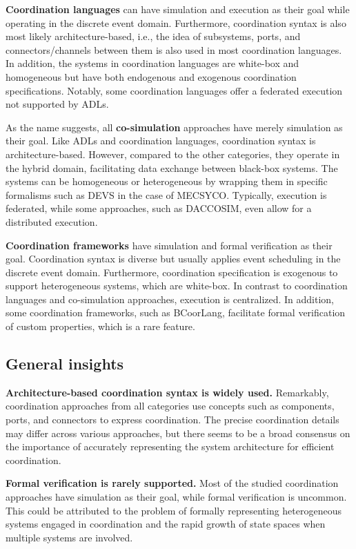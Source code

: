 \documentclass[runningheads]{llncs}
\begin{document}
\textbf{Coordination languages} can have simulation and execution as their goal while operating in the discrete event domain.
Furthermore, coordination syntax is also most likely architecture-based, i.e., the idea of subsystems, ports, and connectors/channels between them is also used in most coordination languages.
In addition, the systems in coordination languages are white-box and homogeneous but have both endogenous and exogenous coordination specifications.
Notably, some coordination languages offer a federated execution not supported by ADLs.

As the name suggests, all \textbf{co-simulation} approaches have merely simulation as their goal.
Like ADLs and coordination languages, coordination syntax is architecture-based.
However, compared to the other categories, they operate in the hybrid domain, facilitating data exchange between black-box systems.
The systems can be homogeneous or heterogeneous by wrapping them in specific formalisms such as DEVS in the case of MECSYCO.
Typically, execution is federated, while some approaches, such as DACCOSIM, even allow for a distributed execution.

\textbf{Coordination frameworks} have simulation and formal verification as their goal.
Coordination syntax is diverse but usually applies event scheduling in the discrete event domain.
Furthermore, coordination specification is exogenous to support heterogeneous systems, which are white-box.
In contrast to coordination languages and co-simulation approaches, execution is centralized.
In addition, some coordination frameworks, such as BCoorLang, facilitate formal verification of custom properties, which is a rare feature.

\subsection{General insights}

\textbf{Architecture-based coordination syntax is widely used.}
Remarkably, coordination approaches from all categories use concepts such as components, ports, and connectors to express coordination.
The precise coordination details may differ across various approaches, but there seems to be a broad consensus on the importance of accurately representing the system architecture for efficient coordination.

\textbf{Formal verification is rarely supported.}
Most of the studied coordination approaches have simulation as their goal, while formal verification is uncommon.
This could be attributed to the problem of formally representing heterogeneous systems engaged in coordination and the rapid growth of state spaces when multiple systems are involved.
\end{document}
